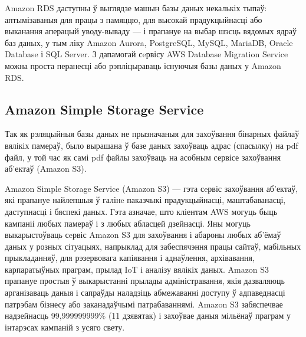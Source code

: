 Amazon RDS даступны ў выглядзе машын базы даных некалькіх тыпаў: аптымізаваныя для працы з памяццю, для высокай прадукцыйнасці або выканання аперацый уводу-вываду --- і прапануе на выбар шэсць вядомых ядраў баз даных, у тым ліку Amazon Aurora, PostgreSQL, MySQL, MariaDB, Oracle Database і SQL Server. З дапамогай сeрвісу AWS Database Migration Service можна проста перанесці або рэпліцыраваць існуючыя базы даных у Amazon RDS.

\subsection{Amazon Simple Storage Service}

Так як рэляцыйныя базы даных не прызначаныя для захоўвання бінарных файлаў вялікіх памераў,
было вырашана ў базе даных захоўваць адрас (спасылку) на pdf файл, у той час як самі
pdf файлы захоўваць на асобным сервісе захоўвання аб'ектаў (Amazon S3).

Amazon Simple Storage Service (Amazon S3) --- гэта сeрвіс захоўвання аб'ектаў, які прапануе найлепшыя ў галінe паказчыкі прадукцыйнасці, маштабаванасці, даступнасці і бяспекі даных. Гэта азначае, што кліентам AWS могуць быць кампаніі любых памераў і з любых абласцей дзейнасці. Яны могуць выкарыстоўваць сeрвіс Amazon S3 для захоўвання і абароны любых аб'ёмаў даных у розных сітуацыях, напрыклад для забеспячэння працы сайтаў, мабільных прыкладанняў, для рэзервовага капіявання і аднаўлення, архівавання, карпаратыўных праграм, прылад IoT і аналізу вялікіх даных. Amazon S3 прапануе простыя ў выкарыстанні прылады адміністравання, якія дазваляюць арганізаваць даныя і сапраўды наладзіць абмежаванні доступу ў адпаведнасці патрэбам бізнесу або заканадаўчымі патрабаваннямі. Amazon S3 забяспечвае надзейнасць 99,999999999\% (11 дзявятак) і захоўвае даныя мільёнаў праграм у інтарэсах кампаній з усяго свету.

